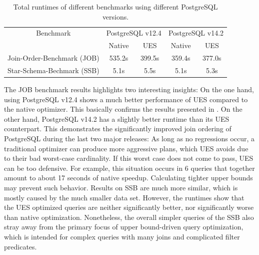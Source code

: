 \begin{table}[t]
    \centering
    \begin{tabular}{|c||c|c||c|c|}
        \hline
         Benchmark& \multicolumn{2}{c||}{PostgreSQL v12.4} & \multicolumn{2}{c|}{PostgreSQL v14.2} \\
         & Native & UES & Native & UES \\
         \hline
         Join-Order-Benchmark (JOB) & 535.2s & 399.5s & 359.4s & 377.0s \\
         Star-Schema-Bechmark (SSB) & 5.1s & 5.5s & 5.1s & 5.3s \\
         \hline
    \end{tabular}
    \caption{Total runtimes of different benchmarks using different PostgreSQL versions.}
    \label{tab:postbound-benchmarks}
    \vspace{-0.4cm}
\end{table}

The JOB benchmark results highlights two interesting insights: On the one hand, using PostgreSQL v12.4 shows a much better performance of UES compared to the native optimizer.
This basically confirms the results presented in \cite{hertzschuch-21-ues}. 
On the other hand, PostgreSQL v14.2 has a slightly better runtime than its UES counterpart. 
This demonstrates the significantly improved join ordering of PostgreSQL during the last two major releases: As long as no regressions occur, a traditional optimizer can produce more aggressive plans, which UES avoids due to their bad worst-case cardinality. 
If this worst case does not come to pass, UES can be too defensive. 
For example, this situation occurs in 6 queries that together amount to about 17 seconds of native speedup. 
Calculating tighter upper bounds may prevent such behavior.
Results on SSB are much more similar, which is mostly caused by the much smaller data set. However, the runtimes show that the UES optimized queries are neither significantly better, nor significantly worse than native optimization. 
Nonetheless, the overall simpler queries of the SSB also stray away from the primary focus of upper bound-driven query optimization, which is intended for complex queries with many joins and complicated filter predicates.

